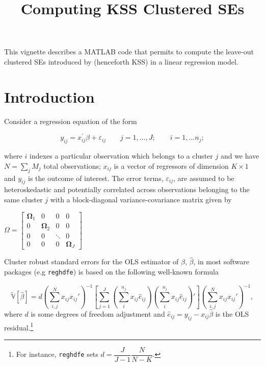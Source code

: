 \documentclass[11pt]{article}
\title{Computing KSS Clustered SEs}
\begin{document}
    
        \maketitle
    
    

    
    This vignette describes a MATLAB code that permits to compute the leave-out
clustered SEs introduced by \cite*{kline2020leave} (henceforth KSS) in a linear regression model. 

    \tableofcontents
    \newpage

    \hypertarget{introduction}{%
\section{Introduction}\label{introduction}}

Consider a regression equation of the form

\begin{equation}
y_{ij} =x_{ij}^{\prime } \beta +\varepsilon_{ij} \qquad j=1,...,J; \qquad i=1,...n_{j}; 
\end{equation}

where \(i\) indexes a particular observation which belongs to a cluster $j$ and we have $N= \sum_{j}M_{j}$ total observations; \(x_{ij}\) is a vector of regressors of dimension $K\times1$ and $y_{ij}$ is the outcome of interest. The error terms, $\varepsilon_{ij}$, are assumed to be heteroskedastic and potentially correlated across observations belonging to the same cluster $j$ with a block-diagonal variance-covariance matrix given by

\begin{center}
{\small{}$\Omega=\left[\begin{array}{cccc}
\mathbf{\Omega}_{1} & 0 & 0 & 0\\
0 & \mathbf{\Omega}_{2} & 0 & 0\\
0 & 0 & \ddots & 0\\
0 & 0 & 0 & \mathbf{\Omega}_{J}
\end{array}\right]$}{\small\par}
\par\end{center}


Cluster robust standard errors for the OLS estimator of $\beta$, $\hat{\beta}$, in most software packages (e.g  \texttt{reghdfe}) is based on the following well-known formula

\begin{equation}
{\mathbb{{\tilde{V}}}}[\hat{\beta}]=d\left(\sum_{i,j}^{N}x_{ij}x_{ij}'\right)^{-1}\left[\sum_{j=1}^J\left(\sum_{i}^{n_{j}}x_{ij}\hat{e}_{ij}\right)\left(\sum_{i}^{n_{j}}x_{ij}\hat{e}_{ij}\right)'\right]\left(\sum_{i,j}^{N}x_{ij}x_{ij}'\right)^{-1},
\end{equation}
where $d$ is some degrees of freedom adjustment and $\hat e_{ij}=y_{ij}-x_{ij}\hat{\beta}$ is the OLS residual.\footnote{For instance, \texttt{reghdfe} sets $d=\dfrac{J}{J-1}\dfrac{N}{N-K}$.}
\end{document}
